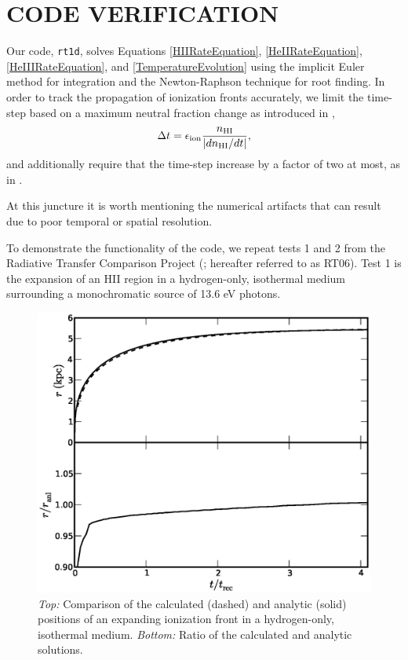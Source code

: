 \documentclass[preprint2]{aastex}              %
\begin{document}
\section{CODE VERIFICATION}
Our code, \texttt{rt1d}, solves Equations \ref{HIIRateEquation}, \ref{HeIIRateEquation}, \ref{HeIIIRateEquation}, and \ref{TemperatureEvolution} using the implicit Euler method for integration and the Newton-Raphson technique for root finding.  In order to track the propagation of ionization fronts accurately, we limit the time-step based on a maximum neutral fraction change as introduced in \cite{Shapiro2004},
\begin{equation}
    \Delta t = \epsilon_{\mathrm{ion}} \frac{n_{\text{HI}}}{|dn_{\text{HI}}/dt|} ,
\end{equation}
and additionally require that the time-step increase by a factor of two at most, as in \cite{Wise2011}.

At this juncture it is worth mentioning the numerical artifacts that can result due to poor temporal or spatial resolution.  

To demonstrate the functionality of the code, we repeat tests 1 and 2 from the Radiative Transfer Comparison Project (\cite{Iliev2006}; hereafter referred to as RT06).  Test 1 is the expansion of an HII region in a hydrogen-only, isothermal medium surrounding a monochromatic source of 13.6 eV photons.  

\begin{figure}[htbp]
\centering
\includegraphics[scale=0.4]{figures/RT_Test1_IfrontEvolution.ps}
\vspace{-20pt}
\caption{\textit{Top:} Comparison of the calculated (dashed) and analytic (solid) positions of an expanding ionization front in a hydrogen-only, isothermal medium. \textit{Bottom:} Ratio of the calculated and analytic solutions.}
\label{fig:RT_Test1_IfrontEvolution}
\end{figure}
\end{document}
